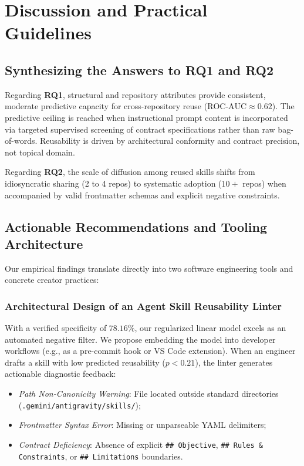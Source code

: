 \documentclass[12pt]{article}
\begin{document}
\section{Discussion and Practical Guidelines}

\subsection{Synthesizing the Answers to RQ1 and RQ2}
Regarding \textbf{RQ1}, structural and repository attributes provide consistent, moderate predictive capacity for cross-repository reuse ($\text{ROC-AUC} \approx 0.62$). The predictive ceiling is reached when instructional prompt content is incorporated via targeted supervised screening of contract specifications rather than raw bag-of-words. Reusability is driven by architectural conformity and contract precision, not topical domain.

Regarding \textbf{RQ2}, the scale of diffusion among reused skills shifts from idiosyncratic sharing (2 to 4 repos) to systematic adoption ($10+$ repos) when accompanied by valid frontmatter schemas and explicit negative constraints.

\subsection{Actionable Recommendations and Tooling Architecture}
Our empirical findings translate directly into two software engineering tools and concrete creator practices:

\subsubsection{Architectural Design of an Agent Skill Reusability Linter}
With a verified specificity of $78.16\%$, our regularized linear model excels as an automated negative filter. We propose embedding the model into developer workflows (e.g., as a pre-commit hook or VS Code extension). When an engineer drafts a skill with low predicted reusability ($p < 0.21$), the linter generates actionable diagnostic feedback:
\begin{itemize}
    \item \emph{Path Non-Canonicity Warning}: File located outside standard directories (\texttt{.gemini/antigravity/skills/});
    \item \emph{Frontmatter Syntax Error}: Missing or unparseable YAML delimiters;
    \item \emph{Contract Deficiency}: Absence of explicit \texttt{\#\# Objective}, \texttt{\#\# Rules \& Constraints}, or \texttt{\#\# Limitations} boundaries.
\end{itemize}
\end{document}
